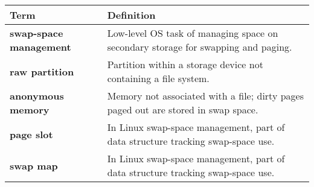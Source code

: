 \vspace{1em}
\begin{tabular}{p{}p{}}
\toprule
\rowcolor{lightgray} \textbf{Term} & \textbf{Definition} \\
\midrule
\textbf{swap-space management} & Low-level OS task of managing space on secondary storage for swapping and paging. \\
\textbf{raw partition} & Partition within a storage device not containing a file system. \\
\textbf{anonymous memory} & Memory not associated with a file; dirty pages paged out are stored in swap space. \\
\textbf{page slot} & In Linux swap-space management, part of data structure tracking swap-space use. \\
\textbf{swap map} & In Linux swap-space management, part of data structure tracking swap-space use. \\
\bottomrule
\end{tabular}

